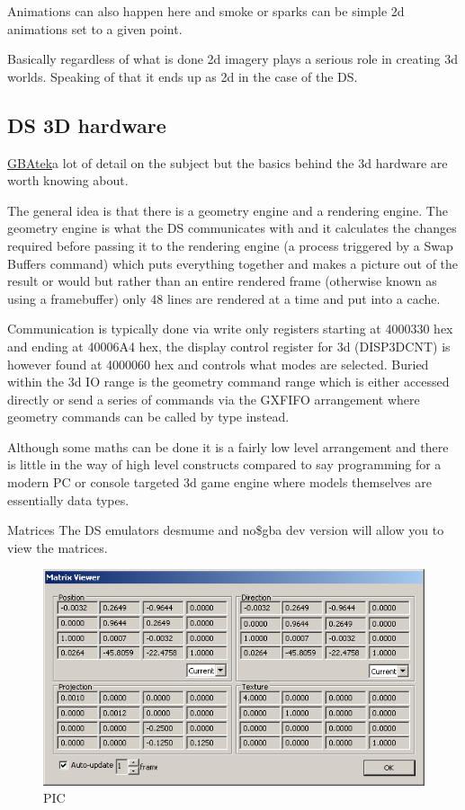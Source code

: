 \documentclass[
]{book}
\begin{document}
Animations can also happen here and smoke or sparks can be simple 2d animations set to a given point.

Basically regardless of what is done 2d imagery plays a serious role in creating 3d worlds. Speaking of that it ends up as 2d in the case of the DS.

\hypertarget{ds-3d-hardware}{%
\subsection{DS 3D hardware}\label{ds-3d-hardware}}

\href{http://problemkaputt.de/gbatek.htm\#ds3dvideocontains}{GBAtek}a lot of detail on the subject but the basics behind the 3d hardware are worth knowing about.

The general idea is that there is a geometry engine and a rendering engine. The geometry engine is what the DS communicates with and it calculates the changes required before passing it to the rendering engine (a process triggered by a Swap Buffers command) which puts everything together and makes a picture out of the result or would but rather than an entire rendered frame (otherwise known as using a framebuffer) only 48 lines are rendered at a time and put into a cache.

Communication is typically done via write only registers starting at 4000330 hex and ending at 40006A4 hex, the display control register for 3d (DISP3DCNT) is however found at 4000060 hex and controls what modes are selected. Buried within the 3d IO range is the geometry command range which is either accessed directly or send a series of commands via the GXFIFO arrangement where geometry commands can be called by type instead.

Although some maths can be done it is a fairly low level arrangement and there is little in the way of high level constructs compared to say programming for a modern PC or console targeted 3d game engine where models themselves are essentially data types.

Matrices The DS emulators desmume and no\$gba dev version will allow you to view the matrices.

\begin{figure}
\centering
\includegraphics{images/61_home_fast6191_romhackingguide_unrenamed_file___l_borders_romhackingguidegraphics3dmatrix_1.png}
\caption{PIC}
\end{figure}
\end{document}
